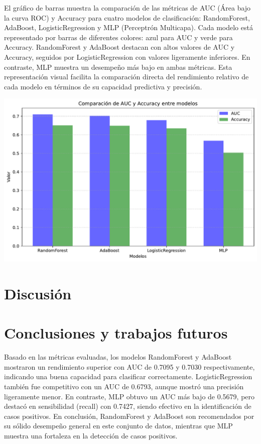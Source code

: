 \documentclass[
  number,
  preprint,
  3p,
  twocolumn]{elsarticle}
\begin{document}
El gráfico de barras muestra la comparación de las métricas de AUC (Área
bajo la curva ROC) y Accuracy para cuatro modelos de clasificación:
RandomForest, AdaBoost, LogisticRegression y MLP (Perceptrón Multicapa).
Cada modelo está representado por barras de diferentes colores: azul
para AUC y verde para Accuracy. RandomForest y AdaBoost destacan con
altos valores de AUC y Accuracy, seguidos por LogisticRegression con
valores ligeramente inferiores. En contraste, MLP muestra un desempeño
más bajo en ambas métricas. Esta representación visual facilita la
comparación directa del rendimiento relativo de cada modelo en términos
de su capacidad predictiva y precisión.

\includegraphics{Articulo_v2_files/figure-pdf/cell-5-output-1.pdf}

\section{Discusión}\label{discusiuxf3n}

\section{Conclusiones y trabajos
futuros}\label{conclusiones-y-trabajos-futuros}

Basado en las métricas evaluadas, los modelos RandomForest y AdaBoost
mostraron un rendimiento superior con AUC de 0.7095 y 0.7030
respectivamente, indicando una buena capacidad para clasificar
correctamente. LogisticRegression también fue competitivo con un AUC de
0.6793, aunque mostró una precisión ligeramente menor. En contraste, MLP
obtuvo un AUC más bajo de 0.5679, pero destacó en sensibilidad (recall)
con 0.7427, siendo efectivo en la identificación de casos positivos. En
conclusión, RandomForest y AdaBoost son recomendados por su sólido
desempeño general en este conjunto de datos, mientras que MLP muestra
una fortaleza en la detección de casos positivos.


\renewcommand\refname{References}
  
\end{document}
